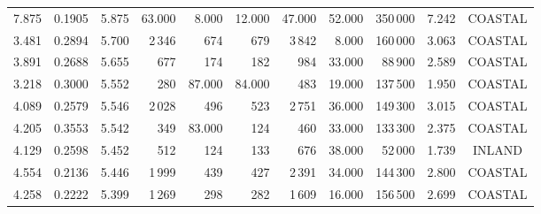 \begin{table}[htbp]
{\begin{tabular}{lrrrrrrrrrr}
7.875 & 0.1905 & 5.875 & 63.000 & 8.000 & 12.000 & 47.000 & 52.000 & 350\,000 & 7.242 & \multicolumn{1}{c}{COASTAL} \\
3.481 & 0.2894 & 5.700 & 2\,346 & 674 & 679 & 3\,842 & 8.000 & 160\,000 & 3.063 & \multicolumn{1}{c}{COASTAL} \\
3.891 & 0.2688 & 5.655 & 677 & 174 & 182 & 984 & 33.000 & 88\,900 & 2.589 & \multicolumn{1}{c}{COASTAL} \\
3.218 & 0.3000 & 5.552 & 280 & 87.000 & 84.000 & 483 & 19.000 & 137\,500 & 1.950 & \multicolumn{1}{c}{COASTAL} \\
4.089 & 0.2579 & 5.546 & 2\,028 & 496 & 523 & 2\,751 & 36.000 & 149\,300 & 3.015 & \multicolumn{1}{c}{COASTAL} \\
4.205 & 0.3553 & 5.542 & 349 & 83.000 & 124 & 460 & 33.000 & 133\,300 & 2.375 & \multicolumn{1}{c}{COASTAL} \\
4.129 & 0.2598 & 5.452 & 512 & 124 & 133 & 676 & 38.000 & 52\,000 & 1.739 & \multicolumn{1}{c}{INLAND} \\
4.554 & 0.2136 & 5.446 & 1\,999 & 439 & 427 & 2\,391 & 34.000 & 144\,300 & 2.800 & \multicolumn{1}{c}{COASTAL} \\
4.258 & 0.2222 & 5.399 & 1\,269 & 298 & 282 & 1\,609 & 16.000 & 156\,500 & 2.699 & \multicolumn{1}{c}{COASTAL} \\
\bottomrule
\end{tabular}%
}
\end{table}
